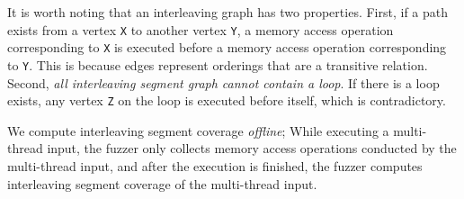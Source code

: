 It is worth noting that an interleaving graph has two
properties. First, if a path exists from a vertex \texttt{X} to
another vertex \texttt{Y}, a memory access operation corresponding to
\texttt{X} is executed before a memory access operation corresponding
to \texttt{Y}.
%
\dr{}
This is because edges represent orderings that are a transitive
relation.
%
Second, \textit{all interleaving segment graph cannot contain a loop}.
%
If there is a loop exists, any vertex \texttt{Z} on the loop is
executed before itself, which is contradictory.


%



%

We compute interleaving segment coverage \textit{offline}; While
executing a multi-thread input, the fuzzer only collects memory access
operations conducted by the multi-thread input, and after the
execution is finished, the fuzzer computes interleaving segment
coverage of the multi-thread input.




